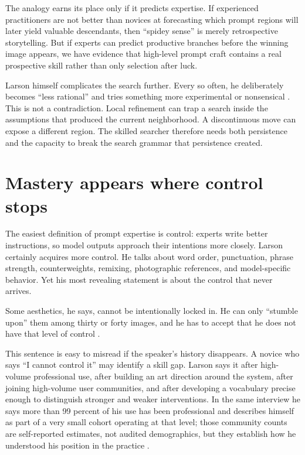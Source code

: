 \documentclass[11pt]{article}
\begin{document}
The analogy earns its place only if it predicts expertise. If experienced practitioners are not better than novices at forecasting which prompt regions will later yield valuable descendants, then ``spidey sense'' is merely retrospective storytelling. But if experts can predict productive branches before the winning image appears, we have evidence that high-level prompt craft contains a real prospective skill rather than only selection after luck.

Larson himself complicates the search further. Every so often, he deliberately becomes ``less rational'' and tries something more experimental or nonsensical \cite{Larson2022}. This is not a contradiction. Local refinement can trap a search inside the assumptions that produced the current neighborhood. A discontinuous move can expose a different region. The skilled searcher therefore needs both persistence and the capacity to break the search grammar that persistence created.

\section{Mastery appears where control stops}
The easiest definition of prompt expertise is control: experts write better instructions, so model outputs approach their intentions more closely. Larson certainly acquires more control. He talks about word order, punctuation, phrase strength, counterweights, remixing, photographic references, and model-specific behavior. Yet his most revealing statement is about the control that never arrives.

Some aesthetics, he says, cannot be intentionally locked in. He can only ``stumble upon'' them among thirty or forty images, and he has to accept that he does not have that level of control \cite{Larson2022}.

This sentence is easy to misread if the speaker's history disappears. A novice who says ``I cannot control it'' may identify a skill gap. Larson says it after high-volume professional use, after building an art direction around the system, after joining high-volume user communities, and after developing a vocabulary precise enough to distinguish stronger and weaker interventions. In the same interview he says more than 99 percent of his use has been professional and describes himself as part of a very small cohort operating at that level; those community counts are self-reported estimates, not audited demographics, but they establish how he understood his position in the practice \cite{Larson2022}.
\end{document}

